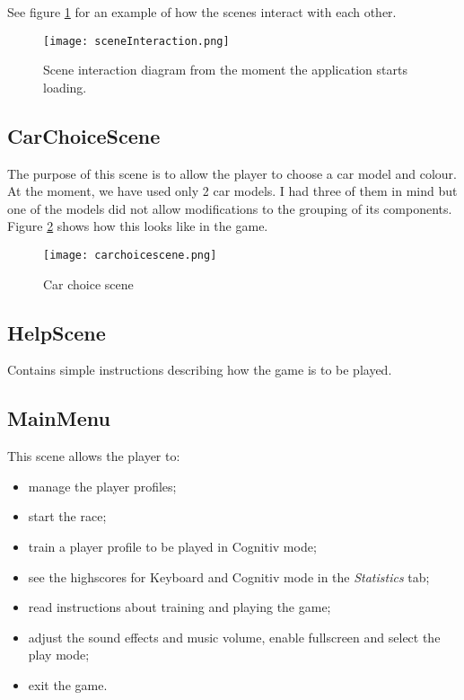 See figure \ref{fig:sceneInteraction} for an example of how the scenes interact with each other.

\begin{figure}
  \centering
  \texttt{[image: sceneInteraction.png]}
  \caption{Scene interaction diagram from the moment the application starts loading.}
    \label{fig:sceneInteraction}           
\end{figure}

\subsection{CarChoiceScene}
The purpose of this scene is to allow the player to choose a car model and colour. At the moment, we have used only 2 car models. I had three of them in mind but one of the models did not allow modifications to the grouping of its components. Figure \ref{fig:carchoicescene} shows how this looks like in the game.

\begin{figure}
  \centering
  \texttt{[image: carchoicescene.png]}
  \caption{Car choice scene}
    \label{fig:carchoicescene}           
\end{figure}

\subsection{HelpScene}
Contains simple instructions describing how the game is to be played. 

\subsection{MainMenu}
This scene allows the player to:
\begin{itemize}
	\item manage the player profiles;
	\item start the race;
	\item train a player profile to be played in Cognitiv mode;
	\item see the highscores for Keyboard and Cognitiv mode in the \textit{Statistics} tab;
	\item read instructions about training and playing the game;
	\item adjust the sound effects and music volume, enable fullscreen and select the play mode;
	\item exit the game.
\end{itemize}

